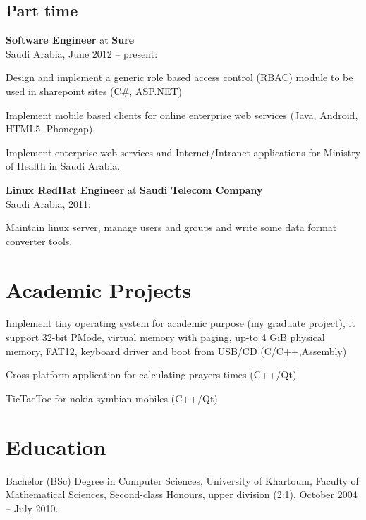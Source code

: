 \documentclass[letterpaper]{article}
\renewenvironment{itemize}{
  \begin{list}{}{
    \setlength{\leftmargin}{1.5em}
  }
}{
  \end{list}
}
\begin{document}
\subsection*{Part time}
\begin{itemize}

\item \textbf{Software Engineer} at \textbf{Sure} \\ Saudi Arabia, June 2012 -- present:
\begin{itemize}
\item Design and implement a generic role based access control (RBAC) module to be used in sharepoint sites (C\#, ASP.NET)
\item Implement mobile based clients for online enterprise web services (Java, Android, HTML5, Phonegap).
\item Implement enterprise web services and Internet/Intranet applications for Ministry of Health in Saudi Arabia.
\end{itemize}

\item \textbf{Linux RedHat Engineer} at \textbf{Saudi Telecom Company} \\ Saudi Arabia, 2011:
\begin{itemize}
\item Maintain linux server, manage users and groups and write some data format converter tools.
\end{itemize}

\end{itemize}

\section*{Academic Projects}
\begin{itemize}
\item Implement tiny operating system for academic purpose (my graduate project), it support 32-bit PMode, virtual memory with paging, up-to 4 GiB physical memory, FAT12, keyboard driver and boot from USB/CD (C/C++,Assembly)
\item Cross platform application for calculating prayers times (C++/Qt)
\item TicTacToe for nokia symbian mobiles (C++/Qt)
\end{itemize}

\section*{Education}
\begin{itemize}
\item Bachelor (BSc) Degree in Computer Sciences, University of Khartoum, Faculty of Mathematical Sciences, Second-class Honours, upper division (2:1), October 2004 -- July 2010.
\end{itemize}
\end{document}
